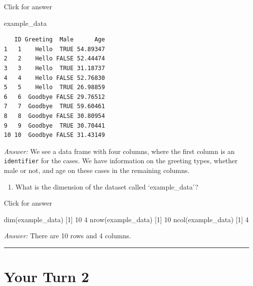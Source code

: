 \documentclass[
]{book}
\newenvironment{Shaded}{\begin{snugshade}}{\end{snugshade}}
\newcommand{\DecValTok}[1]{\textcolor[rgb]{0.00,0.00,0.81}{#1}}
\newcommand{\FunctionTok}[1]{\textcolor[rgb]{0.00,0.00,0.00}{#1}}
\newcommand{\NormalTok}[1]{#1}
\providecommand{\tightlist}{%
  \setlength{\itemsep}{0pt}\setlength{\parskip}{0pt}}
\begin{document}
Click for answer

\begin{Shaded}
\begin{Highlighting}[]
\NormalTok{example\_data}
\end{Highlighting}
\end{Shaded}

\begin{verbatim}
   ID Greeting  Male      Age
1   1    Hello  TRUE 54.89347
2   2    Hello FALSE 52.44474
3   3    Hello  TRUE 31.18737
4   4    Hello FALSE 52.76830
5   5    Hello  TRUE 26.98859
6   6  Goodbye FALSE 29.76512
7   7  Goodbye  TRUE 59.60461
8   8  Goodbye FALSE 30.80954
9   9  Goodbye  TRUE 30.70441
10 10  Goodbye FALSE 31.43149
\end{verbatim}

\emph{Answer:} We see a data frame with four columns, where the first column is an \texttt{identifier} for the cases. We have information on the greeting types, whether male or not, and age on these cases in the remaining columns.

\begin{enumerate}
\def\labelenumi{\alph{enumi}.}
\setcounter{enumi}{1}
\tightlist
\item
  What is the dimension of the dataset called `example\_data'?
\end{enumerate}

Click for answer

\begin{Shaded}
\begin{Highlighting}[]
\FunctionTok{dim}\NormalTok{(example\_data)}
\NormalTok{[}\DecValTok{1}\NormalTok{] }\DecValTok{10}  \DecValTok{4}
\FunctionTok{nrow}\NormalTok{(example\_data)}
\NormalTok{[}\DecValTok{1}\NormalTok{] }\DecValTok{10}
\FunctionTok{ncol}\NormalTok{(example\_data)}
\NormalTok{[}\DecValTok{1}\NormalTok{] }\DecValTok{4}
\end{Highlighting}
\end{Shaded}

\emph{Answer:} There are 10 rows and 4 columns.

\begin{center}\rule{0.5\linewidth}{0.5pt}\end{center}

\hypertarget{your-turn-2}{%
\section{Your Turn 2}\label{your-turn-2}}
\end{document}
